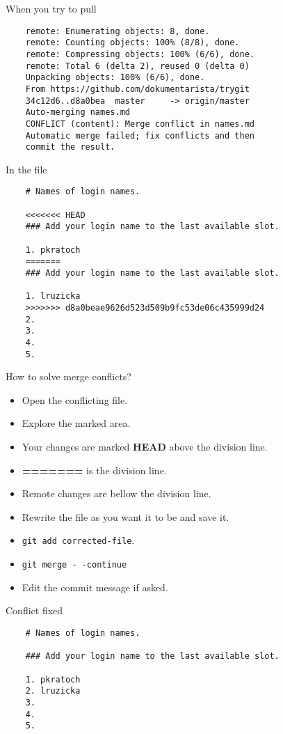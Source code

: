 \documentclass[14pt]{beamer}
\begin{document}
	\begin{frame}[fragile]{When you try to pull}
	\begin{verbatim}
	remote: Enumerating objects: 8, done.
	remote: Counting objects: 100% (8/8), done.
	remote: Compressing objects: 100% (6/6), done.
	remote: Total 6 (delta 2), reused 0 (delta 0) 
	Unpacking objects: 100% (6/6), done.
	From https://github.com/dokumentarista/trygit
	34c12d6..d8a0bea  master     -> origin/master
	Auto-merging names.md
	CONFLICT (content): Merge conflict in names.md
	Automatic merge failed; fix conflicts and then 
	commit the result.
	\end{verbatim}
\end{frame}

	\begin{frame}[fragile]{In the file}
	\begin{verbatim}
	# Names of login names.
	
	<<<<<<< HEAD                                                                                                           
	### Add your login name to the last available slot.
	
	1. pkratoch
	=======
	### Add your login name to the last available slot.
	
	1. lruzicka
	>>>>>>> d8a0beae9626d523d509b9fc53de06c435999d24
	2.
	3.
	4.
	5.
	\end{verbatim}
	\end{frame}

\begin{frame}{How to solve merge conflicts?}
	\begin{itemize}
		\item Open the conflicting file.
		\item Explore the marked area.
		\item Your changes are marked \textbf{HEAD} above the division line.
		\item \textbf{=======} is the division line.
		\item Remote changes are bellow the division line.
		\item Rewrite the file as you want it to be and save it.
		\item \texttt{git add corrected-file}.
		\item \texttt{git merge -\,-continue}
		\item Edit the commit message if asked.
	\end{itemize}
\end{frame}

	\begin{frame}[fragile]{Conflict fixed}
	\begin{verbatim}
	# Names of login names.
	
	### Add your login name to the last available slot.
	
	1. pkratoch
	2. lruzicka
	3.
	4.
	5.
	\end{verbatim}
	\end{frame}
\end{document}
